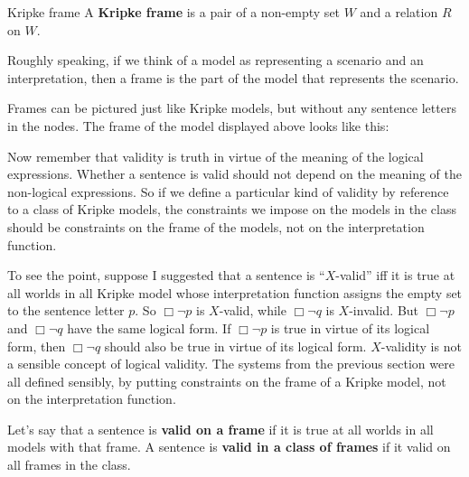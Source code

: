 \begin{definition}{}{Kripke frame}
  A \textbf{Kripke frame} is a pair of a non-empty set $W$ and a relation $R$ on $W$.
\end{definition}

Roughly speaking, if we think of a model as representing a scenario and an
interpretation, then a frame is the part of the model that represents the
scenario.


Frames can be pictured just like Kripke models, but without any sentence letters
in the nodes. The frame of the model displayed above looks like this:
\begin{center}
\end{center}

Now remember that validity is truth in virtue of the meaning of the logical
expressions. Whether a sentence is valid should not depend on the
meaning of the non-logical expressions. So if we define a particular kind of
validity by reference to a class of Kripke models, the constraints we impose on
the models in the class should be constraints on the frame of the models, not on
the interpretation function.

To see the point, suppose I suggested that a sentence is ``$X$-valid'' iff it is true
at all worlds in all Kripke model whose interpretation function assigns the
empty set to the sentence letter $p$. So $\Box \neg p$ is $X$-valid, while
$\Box \neg q$ is $X$-invalid. But $\Box \neg p$ and $\Box \neg q$ have the same
logical form. If $\Box \neg p$ is true in virtue of its logical form, then
$\Box \neg q$ should also be true in virtue of its logical form. $X$-validity is
not a sensible concept of logical validity. The systems from the previous
section were all defined sensibly, by putting constraints on the frame of a
Kripke model, not on the interpretation function.

Let's say that a sentence is \textbf{valid on a frame} if it is true at all
worlds in all models with that frame. A sentence is \textbf{valid in a class of
  frames} if it valid on all frames in the class.

